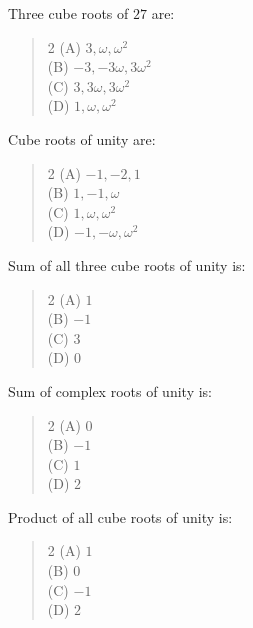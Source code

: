 \documentclass[11pt,a4paper]{article}
\begin{document}
\begin{mcqlist}
\item Three cube roots of $27$ are:
\begin{quote}\begin{multicols}{2}
\noindent (A) $3,\omega,\omega^2$ \\
(B) $-3,-3\omega,3\omega^2$ \\
(C) $3,3\omega,3\omega^2$ \\
(D) $1,\omega,\omega^2$
\end{multicols}\end{quote}

\item Cube roots of unity are:
\begin{quote}\begin{multicols}{2}
\noindent (A) $-1,-2,1$ \\
(B) $1,-1,\omega$ \\
(C) $1,\omega,\omega^2$ \\
(D) $-1,-\omega,\omega^2$
\end{multicols}\end{quote}

\item Sum of all three cube roots of unity is:
\begin{quote}\begin{multicols}{2}
\noindent (A) $1$ \\
(B) $-1$ \\
(C) $3$ \\
(D) $0$
\end{multicols}\end{quote}

\item Sum of complex roots of unity is:
\begin{quote}\begin{multicols}{2}
\noindent (A) $0$ \\
(B) $-1$ \\
(C) $1$ \\
(D) $2$
\end{multicols}\end{quote}

\item Product of all cube roots of unity is:
\begin{quote}\begin{multicols}{2}
\noindent (A) $1$ \\
(B) $0$ \\
(C) $-1$ \\
(D) $2$
\end{multicols}\end{quote}


\end{mcqlist}
\end{document}
